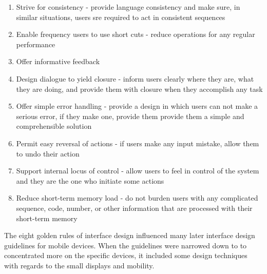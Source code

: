 \begin{enumerate} 
\item Strive for consistency - provide language consistency and make sure, in similar situations, users sre required to act in consistent sequences
\item Enable frequency users to use short cuts - reduce operations for any regular performance 
\item Offer informative feedback 
\item Design dialogue to yield closure - inform users clearly where they are, what they are doing, and provide them with closure when they accomplish any task
\item Offer simple error handling - provide a design in which users can not make a serious error, if they make one, provide them provide them a simple and comprehensible solution
\item Permit easy reversal of actions - if users make any input mistake, allow them to undo their action
\item Support internal locus of control - allow users to feel in control of the system and they are the one who initiate some actions
\item Reduce short-term memory load - do not burden users with any complicated sequence, code, number, or other information that are processed with their short-term memory 
\end{enumerate} 

The eight golden rules of interface design influenced many later interface design guidelines for mobile devices. When the guidelines were narrowed down to to concentrated more on the specific devices, it included some design techniques with regards to the small displays and mobility. 

